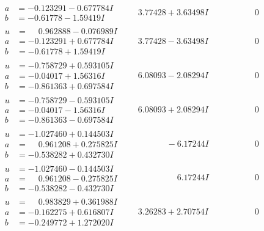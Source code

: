 \documentclass[1p]{elsarticle_modified}
\theoremstyle{definition}
\begin{document}
$$\begin{array}{c|c|c}
\begin{aligned}
a &= -0.123291 - 0.677784 I \\
b &= -0.61778 - 1.59419 I\end{aligned}
 & \phantom{-}3.77428 + 3.63498 I & \phantom{-0.000000 } 0 \\ \hline\begin{aligned}
u &= \phantom{-}0.962888 - 0.076989 I \\
a &= -0.123291 + 0.677784 I \\
b &= -0.61778 + 1.59419 I\end{aligned}
 & \phantom{-}3.77428 - 3.63498 I & \phantom{-0.000000 } 0 \\ \hline\begin{aligned}
u &= -0.758729 + 0.593105 I \\
a &= -0.04017 + 1.56316 I \\
b &= -0.861363 + 0.697584 I\end{aligned}
 & \phantom{-}6.08093 - 2.08294 I & \phantom{-0.000000 } 0 \\ \hline\begin{aligned}
u &= -0.758729 - 0.593105 I \\
a &= -0.04017 - 1.56316 I \\
b &= -0.861363 - 0.697584 I\end{aligned}
 & \phantom{-}6.08093 + 2.08294 I & \phantom{-0.000000 } 0 \\ \hline\begin{aligned}
u &= -1.027460 + 0.144503 I \\
a &= \phantom{-}0.961208 + 0.275825 I \\
b &= -0.538282 + 0.432730 I\end{aligned}
 & \phantom{-0.000000 } -6.17244 I & \phantom{-0.000000 } 0 \\ \hline\begin{aligned}
u &= -1.027460 - 0.144503 I \\
a &= \phantom{-}0.961208 - 0.275825 I \\
b &= -0.538282 - 0.432730 I\end{aligned}
 & \phantom{-0.000000 -}6.17244 I & \phantom{-0.000000 } 0 \\ \hline\begin{aligned}
u &= \phantom{-}0.983829 + 0.361988 I \\
a &= -0.162275 + 0.616807 I \\
b &= -0.249772 + 1.272020 I\end{aligned}
 & \phantom{-}3.26283 + 2.70754 I & \phantom{-0.000000 } 0 \\ \hline\begin{aligned}

\end{aligned}
\end{array}$$
\end{document}
